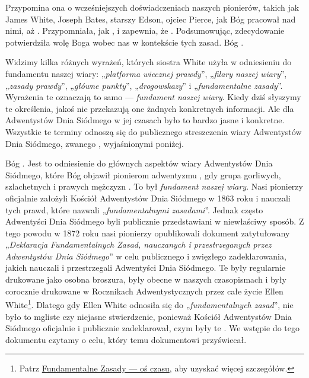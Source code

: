 Przypomina ona o wcześniejszych doświadczeniach naszych pionierów, takich jak James White, Joseph Bates, starszy Edson, ojciec Pierce, jak Bóg pracował nad nimi, aż  . Przypomniała, jak , i zapewnia, że . Podsumowując, zdecydowanie potwierdziła wolę Boga wobec nas w kontekście tych zasad. Bóg .

Widzimy kilka różnych wyrażeń, których siostra White użyła w odniesieniu do fundamentu naszej wiary: „\textit{platforma wiecznej prawdy}”, „\textit{filary naszej wiary}”, „\textit{zasady prawdy}”, „\textit{główne punkty}”, „\textit{drogowskazy}” i „\textit{fundamentalne zasady}”. Wyrażenia te oznaczają to samo — \textit{fundament naszej wiary}. Kiedy dziś słyszymy te określenia, jakoś nie przekazują one żadnych konkretnych informacji. Ale dla Adwentystów Dnia Siódmego w jej czasach było to bardzo jasne i konkretne. Wszystkie te terminy odnoszą się do publicznego streszczenia wiary Adwentystów Dnia Siódmego, zwanego , wyjaśnionymi poniżej.

Bóg . Jest to odniesienie do głównych aspektów wiary Adwentystów Dnia Siódmego, które Bóg objawił pionierom adwentyzmu , gdy grupa gorliwych, szlachetnych i prawych mężczyzn . To był \textit{fundament naszej wiary}. Nasi pionierzy oficjalnie założyli Kościół Adwentystów Dnia Siódmego w 1863 roku i nauczali tych prawd, które nazwali „\textit{fundamentalnymi zasadami}”. Jednak często Adwentyści Dnia Siódmego byli publicznie przedstawiani w niewłaściwy sposób. Z tego powodu w 1872 roku nasi pionierzy opublikowali dokument zatytułowany „\textit{Deklaracja Fundamentalnych Zasad, nauczanych i przestrzeganych przez Adwentystów Dnia Siódmego}” w celu publicznego i zwięzłego zadeklarowania, jakich  nauczali i przestrzegali Adwentyści Dnia Siódmego. Te  były regularnie drukowane jako osobna broszura, były obecne w naszych czasopismach i były corocznie drukowane w Rocznikach Adwentystycznych przez całe życie Ellen White\footnote{Patrz \hyperref[appendix:timeline]{Fundamentalne Zasady — oś czasu}, aby uzyskać więcej szczegółów.}. Dlatego gdy Ellen White odnosiła się do „\textit{fundamentalnych zasad}”, nie było to mgliste czy niejasne stwierdzenie, ponieważ Kościół Adwentystów Dnia Siódmego oficjalnie i publicznie zadeklarował, czym były te . We wstępie do tego dokumentu czytamy o celu, który temu dokumentowi przyświecał.

